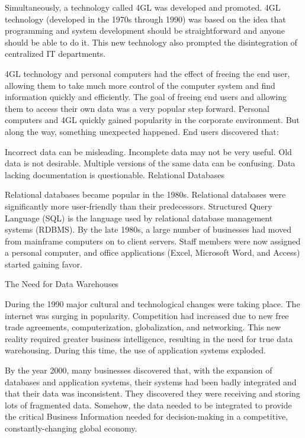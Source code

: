 \documentclass{article}
\begin{document}
Simultaneously, a technology called 4GL was developed and promoted. 4GL technology (developed in the 1970s through 1990) was based on the idea that programming and system development should be straightforward and anyone should be able to do it. This new technology also prompted the disintegration of centralized IT departments.

4GL technology and personal computers had the effect of freeing the end user, allowing them to take much more control of the computer system and find information quickly and efficiently. The goal of freeing end users and allowing them to access their own data was a very popular step forward. Personal computers and 4GL quickly gained popularity in the corporate environment. But along the way, something unexpected happened. End users discovered that:

Incorrect data can be misleading.
Incomplete data may not be very useful.
Old data is not desirable.
Multiple versions of the same data can be confusing.
Data lacking documentation is questionable.
Relational Databases

Relational databases became popular in the 1980s. Relational databases were significantly more user-friendly than their predecessors. Structured Query Language (SQL) is the language used by relational database management systems (RDBMS). By the late 1980s, a large number of businesses had moved from mainframe computers on to client servers.  Staff members were now assigned a personal computer, and office applications (Excel, Microsoft Word, and Access) started gaining favor.

The Need for Data Warehouses

During the 1990 major cultural and technological changes were taking place. The internet was surging in popularity. Competition had increased due to new free trade agreements, computerization, globalization, and networking. This new reality required greater business intelligence, resulting in the need for true data warehousing. During this time, the use of application systems exploded.

By the year 2000, many businesses discovered that, with the expansion of databases and application systems, their systems had been badly integrated and that their data was inconsistent. They discovered they were receiving and storing lots of fragmented data. Somehow, the data needed to be integrated to provide the critical Business Information needed for decision-making in a competitive, constantly-changing global economy.
\end{document}
